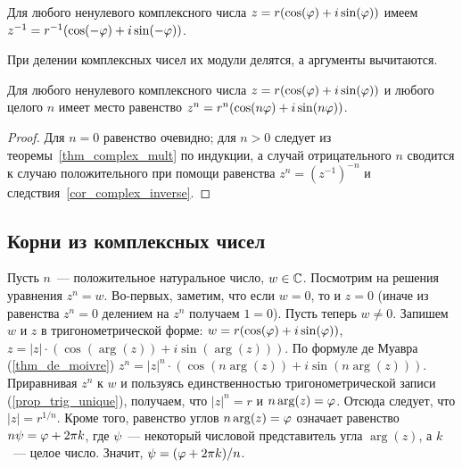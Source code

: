 \begin{corollary}\label{cor_complex_inverse}
Для любого ненулевого комплексного числа $z=r(\cos(\varphi)+i\sin(\varphi))$ имеем
$z^{-1}=r^{-1}(\cos(-\varphi)+i\sin(-\varphi))$.
\end{corollary}

\begin{corollary}
При делении комплексных чисел их модули делятся, а аргументы вычитаются.
\end{corollary}

\begin{corollary}\label{thm_de_moivre}
Для любого ненулевого комплексного числа $z=r(\cos(\varphi)+i\sin(\varphi))$
и любого целого $n$ имеет место равенство $z^n=r^n(\cos(n\varphi)+i\sin(n\varphi))$.
\end{corollary}
\begin{proof}
Для $n=0$ равенство очевидно; для $n>0$ следует из
теоремы~\ref{thm_complex_mult} по индукции, а случай отрицательного
$n$ сводится к случаю положительного при помощи равенства
$z^n=(z^{-1})^{-n}$ и следствия~\ref{cor_complex_inverse}.
\end{proof}

\subsection{Корни из комплексных чисел}


Пусть $n$~--- положительное натуральное число, $w\in\mathbb C$. Посмотрим
на решения уравнения $z^n=w$. Во-первых, заметим, что если $w=0$, то
и $z=0$ (иначе из равенства $z^n=0$ делением на $z^n$ получаем
$1=0$). Пусть теперь $w\neq 0$. Запишем $w$ и $z$ в тригонометрической
форме: $w=r(\cos(\varphi)+i\sin(\varphi))$,
$z=|z|\cdot(\cos(\arg(z))+i\sin(\arg(z)))$.
По формуле де Муавра (\ref{thm_de_moivre})
$z^n=|z|^n\cdot(\cos(n\arg(z))+i\sin(n\arg(z)))$. Приравнивая $z^n$ к
$w$ и пользуясь единственностью тригонометрической записи
(\ref{prop_trig_unique}), получаем, что $|z|^n=r$ и
$n\arg(z)=\varphi$. Отсюда следует, что $|z|=r^{1/n}$. Кроме того,
равенство углов $n\arg(z)=\varphi$ означает равенство $n\psi=\varphi+2\pi k$,
где $\psi$~--- некоторый числовой представитель угла $\arg(z)$, а
$k$~--- целое число.
Значит, $\psi=(\varphi+2\pi k)/n$.

